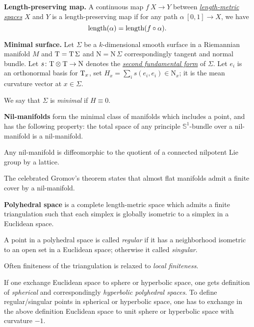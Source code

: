 \begin{description}
\item{\bf Length-preserving map.}\label{Length-preserving map} 
A continuous map $f\:X\to Y$ between 
\hyperref[Length-metric space]{\emph{length-metric spaces}} 
$X$ and $Y$ is a length-preserving map if for any path $\alpha\:[0,1]\to X$, we have 
$$\operatorname{\rm length}(\alpha)=\operatorname{\rm length}(f\circ\alpha).$$

\item{\bf Minimal surface.}\label{Minimal surface} 
Let $\Sigma$ be a $k$-dimensional smooth surface in
a Riemannian manifold $M$
and $\mathrm{T}=\mathrm{T}\,\Sigma$ and $\mathrm{N}=\mathrm{N}\,\Sigma$ correspondingly tangent and normal bundle.
Let $s\colon\mathrm{T}\otimes \mathrm{T}\to \mathrm{N}$ denotes the \hyperref[Second fundamental form]{\emph{second fundamental form}} of $\Sigma$.
Let  $e_i$ is an orthonormal basis for $\mathrm{T}_x$, 
set $H_x=\sum_i s(e_i,e_i)\in \mathrm{N}_x$; 
it is the mean curvature vector at $x\in \Sigma$. 

We say that $\Sigma$ is \emph{minimal} if $H\equiv 0$.

\item{\bf Nil-manifolds}\label{Nil-manifolds} form the minimal class of manifolds which includes a point, and has the following property:  
the total space of any principle $\mathbb{S}^1$-bundle over a nil-manifold is a nil-manifold. 

Any nil-manifold is diffeomorphic to the quotient of a connected nilpotent Lie group by a lattice.

The celebrated Gromov's theorem states that almost flat manifolds admit a finite cover by a nil-manifold.



\item{\bf Polyhedral space}\label{Polyhedral space}
is a complete length-metric space which admits a finite triangulation 
such that each simplex is globally isometric to a simplex in a Euclidean space.

A point in a polyhedral space is called \emph{regular} if it has a neighborhood isometric to an open set in a Euclidean space;
otherwise it called \emph{singular}.

Often finiteness of the triangulation is relaxed to \emph{local finiteness}.

If one exchange Euclidean space to sphere or hyperbolic space,
one gets definition of \emph{spherical} and correspondingly \emph{hyperbolic polyhedral spaces}.
To define regular/singular points in spherical or hyperbolic space,
one has to exchange in the above definition Euclidean space to unit sphere or hyperbolic space with curvature $-1$.



\end{description}
